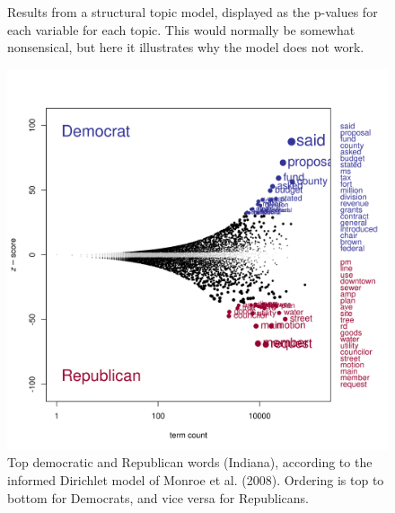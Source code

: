 \documentclass[11pt]{article}
\begin{document}
\begin{figure}[!ht]
	\centering %
	\caption{Results from a structural topic model, displayed as the p-values for each variable for each topic. This would normally be somewhat nonsensical, but here it illustrates why the model does not work.}
	\label{stm_results}
\end{figure}

\begin{figure}[!ht]
	\centering %
	\caption{Top democratic and Republican words (Indiana), according to the informed Dirichlet model of Monroe et al. (2008). Ordering is top to bottom for Democrats, and vice versa for Republicans.}
	\label{fightinwordsIN}
	\includegraphics[width=\linewidth]{figures/fightinWordsIN.png}
\end{figure}
\end{document}
